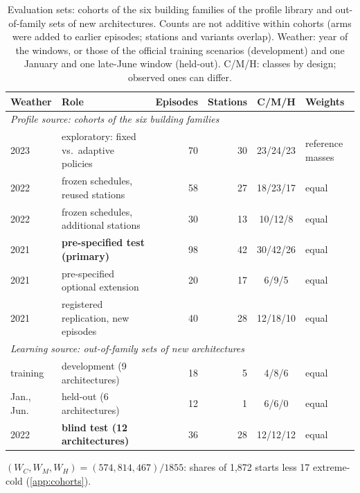 \documentclass{article}
\begin{document}
\begin{table}[t]
\centering
\setlength{\tabcolsep}{5pt}
\begin{threeparttable}
\caption{Evaluation sets: cohorts of the six building families of the profile library and out-of-family sets of new
architectures. Counts are not additive within cohorts (arms were added to earlier episodes; stations and variants
overlap). Weather: year of the windows, or those of the official training scenarios (development) and one January and
one late-June window (held-out). C/M/H: classes by design; observed ones can differ.}
\label{tab:cohorts}
\small
\begin{tabular}{llrrcl}
\toprule
Weather & Role & Episodes & Stations & C/M/H & Weights\\
\midrule
\multicolumn{6}{l}{\emph{Profile source: cohorts of the six building families}}\\
2023 & exploratory: fixed vs.\ adaptive policies & 70 & 30 & 23/24/23 & reference masses\tnote{a}\\
2022 & frozen schedules, reused stations           & 58 & 27 & 18/23/17 & equal\\
2022 & frozen schedules, additional stations       & 30 & 13 & 10/12/8  & equal\\
2021 & \textbf{pre-specified test (primary)}       & 98 & 42 & 30/42/26 & equal\\
2021 & pre-specified optional extension            & 20 & 17 & 6/9/5    & equal\\
2021 & registered replication, new episodes        & 40 & 28 & 12/18/10 & equal\\
\midrule
\multicolumn{6}{l}{\emph{Learning source: out-of-family sets of new architectures}}\\
training   & development (9 architectures)          & 18 & 5  & 4/8/6    & equal\\
Jan., Jun. & held-out (6 architectures)             & 12 & 1  & 6/6/0    & equal\\
2022       & \textbf{blind test (12 architectures)} & 36 & 28 & 12/12/12 & equal\\
\bottomrule
\end{tabular}
\begin{tablenotes}\footnotesize
\item[a] $(W_C,W_M,W_H) = (574,814,467)/1855$: shares of 1,872 starts less 17 extreme-cold
(\cref{app:cohorts}).
\end{tablenotes}
\end{threeparttable}
\end{table}
\end{document}
